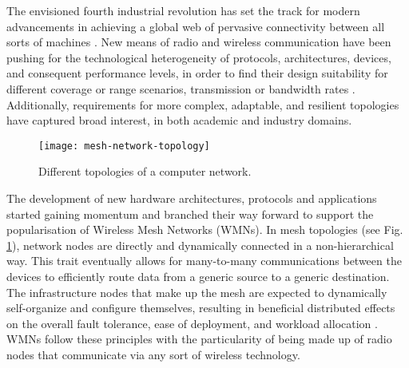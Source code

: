 The envisioned fourth industrial revolution has set the track for modern advancements in achieving a global web of pervasive connectivity between all sorts of machines \cite{akyildiz2005wireless, cilfone2019wireless}. New means of radio and wireless communication have been pushing for the technological heterogeneity of protocols, architectures, devices, and consequent performance levels, in order to find their design suitability for different coverage or range scenarios, transmission or bandwidth rates \cite{sichitiu2005wireless}. Additionally, requirements for more complex, adaptable, and resilient topologies have captured broad interest, in both academic and industry domains. 

\begin{figure} [ht]
  \begin{center}
  \texttt{[image: mesh-network-topology]}
  \caption{Different topologies of a computer network.}
  \label{fig:mesh-network-topology}
  \end{center}
\end{figure}


The development of new hardware architectures, protocols and applications started gaining momentum and branched their way forward to support the popularisation of Wireless Mesh Networks (WMNs). In mesh topologies (see Fig. \ref{fig:mesh-network-topology}), network nodes are directly and dynamically connected in a non-hierarchical way. This trait eventually allows for many-to-many communications between the devices to efficiently route data from a generic source to a generic destination. The infrastructure nodes that make up the mesh are expected to dynamically self-organize and configure themselves, resulting in beneficial distributed effects on the overall fault tolerance, ease of deployment, and workload allocation \cite{cilfone2019wireless, sichitiu2005wireless}. WMNs follow these principles with the particularity of being made up of radio nodes that communicate via any sort of wireless technology.

